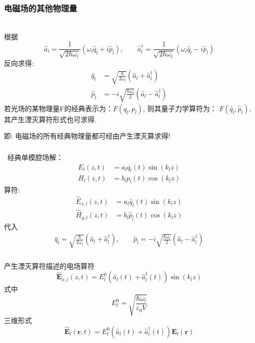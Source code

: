 \begin{frame}
  \frametitle{电磁场的其他物理量}
  ~\\
  根据
  \[
    \hat{a}_l = \frac{1}{\sqrt{2\hbar \omega_l}} (\omega_l\hat{q}_l+i \hat{p}_l)  , \qquad
    \hat{a}_l ^\dagger = \frac{1}{\sqrt{2\hbar \omega_l}} (\omega_l\hat{q}_l-i \hat{p}_l)  
    \]  
  反向求得: 
  \[ \begin{aligned}
     \hat{q}_l &= \sqrt{\frac{\hbar}{ 2\omega_l}} (\hat{a}_l+ \hat{a}_l ^\dagger) \\ 
     \hat{p}_l &= -i\sqrt{\frac{\hbar\omega_l}{2 }} (\hat{a}_l- \hat{a}_l ^\dagger)  
  \end{aligned} \] 
若光场的某物理量F的经典表示为：$F(q_l, p_l)$, 则其量子力学算符为： $F(\hat{q}_l, \hat{p}_l)$, 其产生湮灭算符形式也可求得. \\ {\vspace*{1.3em}}

即: 电磁场的所有经典物理量都可经由产生湮灭算求得!     
\end{frame}

\begin{frame}
    \frametitle{}
    \例 [1.求单模腔场电磁场分量的算符形式] {}
    \解 ~经典单模腔场解： 
    \[ \begin{aligned}
      E_{l}(z,t) &= a_l q_l (t) \sin (k_l z)\\
      H_{l}(z,t) &= b_l p_l (t) \cos (k_l z)
    \end{aligned}\] 
    算符:
    \[ \begin{aligned}
      \hat{E}_{x,l}(z,t) &= a_l \hat{q}_l (t) \sin (k_l z)\\
      \hat{H}_{y,l}(z,t) &= b_l \hat{p}_l (t) \cos (k_l z)
    \end{aligned}\] 
    代入
      \[ \begin{aligned}
        \hat{q}_l = \sqrt{\frac{\hbar}{ 2\omega_l}} (\hat{a}_l+ \hat{a}_l ^\dagger) , \qquad  
        \hat{p}_l = -i\sqrt{\frac{\hbar\omega_l}{2 }} (\hat{a}_l- \hat{a}_l ^\dagger)  
     \end{aligned} \] 
\end{frame}

\begin{frame} 
\frametitle{}
    产生湮灭算符描述的电场算符
    \[ 
      \hat{\mathbf{E}}_{x,l}( z,t) = E^0 _l \left(\hat{a}_l(t)+ \hat{a}_l ^\dagger(t) \right) \sin (k_l z)
      \] 
    式中 \[ E^0 _l = \sqrt{\frac{\hbar \omega_l }{\varepsilon_0 V}}\]
    三维形式
    \[ \hat{\mathbf{E}}_l(\mathbf{r},t) = E^0 _l \left(\hat{a}_l(t)+ \hat{a}_l ^\dagger(t) \right) \mathbf{E}_l(\mathbf{r}) \]
\end{frame}


